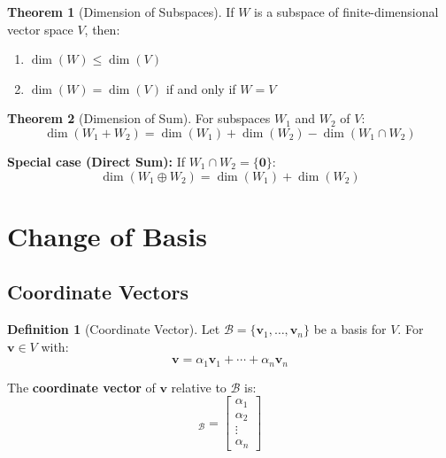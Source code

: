\documentclass[12pt,a4paper]{article}
\theoremstyle{definition}
\newtheorem{definition}{Definition}[section]
\newtheorem{theorem}{Theorem}[section]
\begin{document}
\begin{theorem}[Dimension of Subspaces]
If $W$ is a subspace of finite-dimensional vector space $V$, then:
\begin{enumerate}
    \item $\dim(W) \leq \dim(V)$
    \item $\dim(W) = \dim(V)$ if and only if $W = V$
\end{enumerate}
\end{theorem}

\begin{theorem}[Dimension of Sum]
For subspaces $W_1$ and $W_2$ of $V$:
\begin{equation}
\dim(W_1 + W_2) = \dim(W_1) + \dim(W_2) - \dim(W_1 \cap W_2)
\end{equation}

\textbf{Special case (Direct Sum):} If $W_1 \cap W_2 = \{\mathbf{0}\}$:
\begin{equation}
\dim(W_1 \oplus W_2) = \dim(W_1) + \dim(W_2)
\end{equation}
\end{theorem}

\section{Change of Basis}

\subsection{Coordinate Vectors}

\begin{definition}[Coordinate Vector]
Let $\mathcal{B} = \{\mathbf{v}_1, \ldots, \mathbf{v}_n\}$ be a basis for $V$. For $\mathbf{v} \in V$ with:
\begin{equation}
\mathbf{v} = \alpha_1\mathbf{v}_1 + \cdots + \alpha_n\mathbf{v}_n
\end{equation}

The \textbf{coordinate vector} of $\mathbf{v}$ relative to $\mathcal{B}$ is:
\begin{equation}
[\mathbf{v}]_\mathcal{B} = \begin{bmatrix} \alpha_1 \\ \alpha_2 \\ \vdots \\ \alpha_n \end{bmatrix}
\end{equation}
\end{definition}
\end{document}
